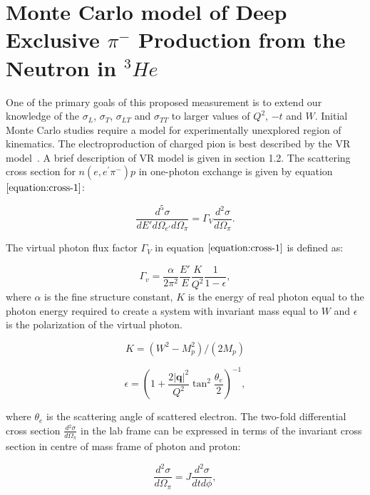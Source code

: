 \section{Monte Carlo model of Deep Exclusive $\pi^{-}$ Production from the Neutron in $^{3}He$ }
One of the primary goals of this proposed measurement is to extend our knowledge of the $\sigma_{L}$, $\sigma_{T}$, 
$\sigma_{LT}$ and $\sigma_{TT}$ to larger values of $Q^2$, $-t$ and $W$. Initial Monte Carlo studies require a model for 
experimentally unexplored region of kinematics. The electroproduction of charged pion is best described by the VR model~\cite{vr}.
 A brief description of VR model is given in section 1.2. The scattering cross section for 
$n(e,e^{\prime}\pi^{-})p$ in one-photon exchange is given by equation $\ref{equation:cross-1}$:

\begin{equation}
  \frac{d^{5} \sigma}{dE' d\Omega_{e'} d\Omega_{\pi}} = \Gamma_{V} \frac{d{^2} \sigma}{d\Omega_{\pi}}.
  \label{equation:cross-1}
\end{equation}

The virtual photon flux factor $\Gamma_{V}$ in equation $\ref{equation:cross-1}$ is defined as:

\begin{equation}
  \Gamma_v=\frac{\alpha}{2\pi^2} \frac{E'}{E} \frac{K}{Q^2}\frac{1}{1-\epsilon},
  \label{equation:photon-flux-1}
\end{equation}
where $\alpha$ is the fine structure constant, $K$ is the energy of real photon equal to the photon energy required to create 
a system with invariant mass equal to $W$ and $\epsilon$ is the polarization of
the virtual photon.

\begin{equation}
  K=(W^2-M_p^2)/(2 M_p)
  \label{equation:photon-flux-2}
\end{equation}

\begin{equation}
  \epsilon=\left(1+\frac{2 |\mathbf{q}|^2}{Q^2} \tan^2\frac{\theta_{e}}{2} \right)^{-1},
  \label{equation:photon-flux-3}
\end{equation}

where $\theta_{e}$ is the scattering angle of scattered electron. The two-fold differential cross section 
$\frac{d{^2} \sigma}{d\Omega_{\pi}}$ in the lab frame can be expressed in terms of the invariant cross section in centre of 
mass frame of photon and proton:

\begin{equation}
  \frac{d^2 \sigma}{d\Omega_\pi}= J \frac{d^2 \sigma}{dt d\phi},
  \label{equation:cross-2}
\end{equation}

